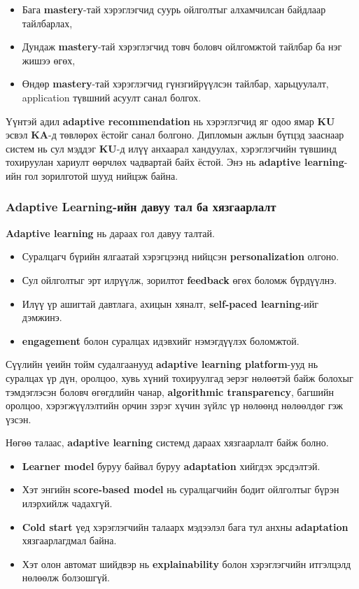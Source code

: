 \documentclass[12pt,A4]{report}
\begin{document}
\begin{itemize}
    \item Бага \textbf{mastery}-тай хэрэглэгчид суурь ойлголтыг алхамчилсан байдлаар тайлбарлах,
    \item Дундаж \textbf{mastery}-тай хэрэглэгчид товч боловч ойлгомжтой тайлбар ба нэг жишээ өгөх,
    \item Өндөр \textbf{mastery}-тай хэрэглэгчид гүнзгийрүүлсэн тайлбар, харьцуулалт, application түвшний асуулт санал болгох.
\end{itemize}

Үүнтэй адил \textbf{adaptive recommendation} нь хэрэглэгчид яг одоо ямар \textbf{KU} эсвэл \textbf{KA}-д төвлөрөх ёстойг санал болгоно. Дипломын ажлын бүтцэд зааснаар систем нь сул мэддэг \textbf{KU}-д илүү анхаарал хандуулах, хэрэглэгчийн түвшинд тохируулан хариулт өөрчлөх чадвартай байх ёстой. Энэ нь \textbf{adaptive learning}-ийн гол зорилготой шууд нийцэж байна.

\subsubsection*{Adaptive Learning-ийн давуу тал ба хязгаарлалт}

\textbf{Adaptive learning} нь дараах гол давуу талтай.

\begin{itemize}
    \item Суралцагч бүрийн ялгаатай хэрэгцээнд нийцсэн \textbf{personalization} олгоно.
    \item Сул ойлголтыг эрт илрүүлж, зорилтот \textbf{feedback} өгөх боломж бүрдүүлнэ.
    \item Илүү үр ашигтай давтлага, ахицын хяналт, \textbf{self-paced learning}-ийг дэмжинэ.
    \item \textbf{engagement} болон суралцах идэвхийг нэмэгдүүлэх боломжтой.
\end{itemize}

Сүүлийн үеийн тойм судалгаанууд \textbf{adaptive learning platform}-ууд нь суралцах үр дүн, оролцоо, хувь хүний тохируулгад эерэг нөлөөтэй байж болохыг тэмдэглэсэн боловч өгөгдлийн чанар, \textbf{algorithmic transparency}, багшийн оролцоо, хэрэгжүүлэлтийн орчин зэрэг хүчин зүйлс үр нөлөөнд нөлөөлдөг гэж үзсэн.

Нөгөө талаас, \textbf{adaptive learning} системд дараах хязгаарлалт байж болно.

\begin{itemize}
    \item \textbf{Learner model} буруу байвал буруу \textbf{adaptation} хийгдэх эрсдэлтэй.
    \item Хэт энгийн \textbf{score-based model} нь суралцагчийн бодит ойлголтыг бүрэн илэрхийлж чадахгүй.
    \item \textbf{Cold start} үед хэрэглэгчийн талаарх мэдээлэл бага тул анхны \textbf{adaptation} хязгаарлагдмал байна.
    \item Хэт олон автомат шийдвэр нь \textbf{explainability} болон хэрэглэгчийн итгэлцэлд нөлөөлж болзошгүй.
\end{itemize}
\end{document}
